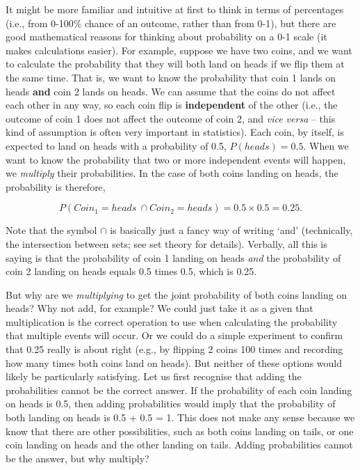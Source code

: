 \documentclass[
]{scrbook}
\begin{document}
It might be more familiar and intuitive at first to think in terms of percentages (i.e., from 0-100\% chance of an outcome, rather than from 0-1), but there are good mathematical reasons for thinking about probability on a 0-1 scale (it makes calculations easier).
For example, suppose we have two coins, and we want to calculate the probability that they will both land on heads if we flip them at the same time.
That is, we want to know the probability that coin 1 lands on heads \textbf{and} coin 2 lands on heads.
We can assume that the coins do not affect each other in any way, so each coin flip is \textbf{independent} of the other (i.e., the outcome of coin 1 does not affect the outcome of coin 2, and \emph{vice versa} -- this kind of assumption is often very important in statistics).
Each coin, by itself, is expected to land on heads with a probability of 0.5, \(P(heads) = 0.5\).
When we want to know the probability that two or more independent events will happen, we \emph{multiply} their probabilities.
In the case of both coins landing on heads, the probability is therefore,

\[P(Coin_{1} = heads\:\cap Coin_{2} = heads) = 0.5 \times 0.5 = 0.25.\]

Note that the symbol \(\cap\) is basically just a fancy way of writing `and' (technically, the intersection between sets; see set theory for details).
Verbally, all this is saying is that the probability of coin 1 landing on heads \emph{and} the probability of coin 2 landing on heads equals 0.5 times 0.5, which is 0.25.

But why are we \emph{multiplying} to get the joint probability of both coins landing on heads?
Why not add, for example?
We could just take it as a given that multiplication is the correct operation to use when calculating the probability that multiple events will occur.
Or we could do a simple experiment to confirm that 0.25 really is about right (e.g., by flipping 2 coins 100 times and recording how many times both coins land on heads).
But neither of these options would likely be particularly satisfying.
Let us first recognise that adding the probabilities cannot be the correct answer.
If the probability of each coin landing on heads is 0.5, then adding probabilities would imply that the probability of both landing on heads is 0.5 + 0.5 = 1.
This does not make any sense because we know that there are other possibilities, such as both coins landing on tails, or one coin landing on heads and the other landing on tails.
Adding probabilities cannot be the answer, but why multiply?
\end{document}
